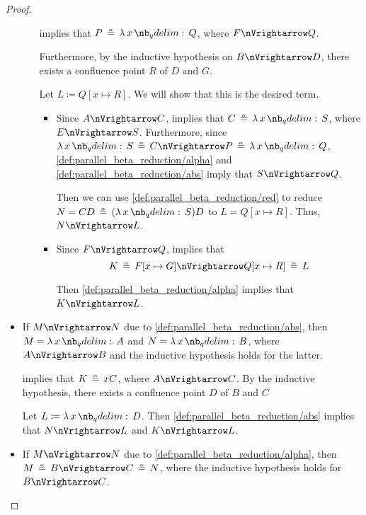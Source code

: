 \begin{proof}
\begin{itemize}
\begin{itemize}
       implies that \( P \aequiv \qabs x Q \), where \( F \pred Q \).

      Furthermore, by the inductive hypothesis on \( B \pred D \), there exists a confluence point \( R \) of \( D \) and \( G \).

      Let \( L \coloneqq Q[x \mapsto R] \). We will show that this is the desired term.
      \begin{itemize}
        \item Since \( A \pred C \),  implies that \( C \aequiv \qabs x S \), where \( E \pred S \). Furthermore, since \( \qabs x S \aequiv C \pred P \aequiv \qabs x Q \), \ref{def:parallel_beta_reduction/alpha} and \ref{def:parallel_beta_reduction/abs} imply that \( S \pred Q \).

        Then we can use \ref{def:parallel_beta_reduction/red} to reduce \( N = CD \aequiv (\qabs x S) D \) to \( L = Q[x \mapsto R] \). Thus, \( N \pred L \).

        \item Since \( F \pred Q \),  implies that
        \begin{equation*}
          K \aequiv F[x \mapsto G] \pred Q[x \mapsto R] \aequiv L
        \end{equation*}

         Then \ref{def:parallel_beta_reduction/alpha} implies that \( K \pred L \).
      \end{itemize}
    \end{itemize}

    \item If \( M \pred N \) due to \ref{def:parallel_beta_reduction/abs}, then \( M = \qabs x A \) and \( N = \qabs x B \), where \( A \pred B \) and the inductive hypothesis holds for the latter.

     implies that \( K \aequiv x C \), where \( A \pred C \). By the inductive hypothesis, there exists a confluence point \( D \) of \( B \) and \( C \)

    Let \( L \coloneqq \qabs x D \). Then \ref{def:parallel_beta_reduction/abs} implies that \( N \pred L \) and \( K \pred L \).

    \item If \( M \pred N \) due to \ref{def:parallel_beta_reduction/alpha}, then \( M \aequiv B \pred C \aequiv N \), where the inductive hypothesis holds for \( B \pred C \).


\end{itemize}
\end{proof}
